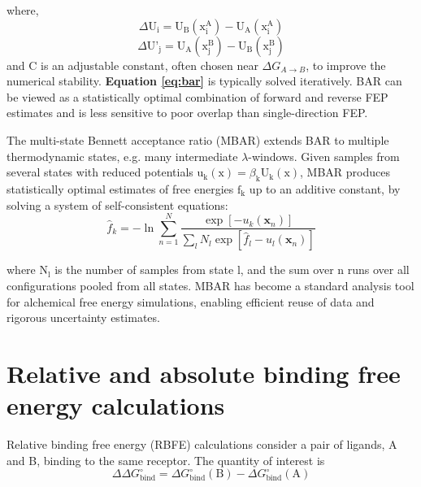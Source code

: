 \documentclass[12pt]{article}
\begin{document}
where,
\begin{equation}
 \Delta \textrm{U}_\textrm{i} = \textrm{U}_\textrm{B}(\textrm{x}_\textrm{i}^\textrm{A}) - \textrm{U}_\textrm{A}(\textrm{x}_\textrm{i}^\textrm{A}) 
\end{equation}
\begin{equation}
 \Delta \textrm{U'}_\textrm{j} = \textrm{U}_\textrm{A}(\textrm{x}_\textrm{j}^\textrm{B}) - \textrm{U}_\textrm{B}(\textrm{x}_\textrm{j}^\textrm{B})
\end{equation}
 and C is an adjustable constant, often chosen near $\Delta G_{A\to B}$, to improve the numerical stability. \textbf{Equation \ref{eq:bar}} is typically solved iteratively. BAR can be viewed as a statistically optimal combination of forward and reverse FEP estimates and is less sensitive to poor overlap than single-direction FEP\cite{CH10_bennett1976efficient,CH10_deruiter2013comparison}. 

The multi-state Bennett acceptance ratio (MBAR) extends BAR to multiple thermodynamic states, e.g. many intermediate $\lambda$-windows\cite{CH10_shirts2008mbar}. Given samples from several states with reduced potentials $\textrm{u}_\textrm{k}(\textrm{x}) = \beta_\textrm{k} \textrm{U}_\textrm{k}(\textrm{x})$, MBAR produces statistically optimal estimates of free energies $\textrm{f}_\textrm{k}$ up to an additive constant, by solving a system of self-consistent equations:
\begin{equation}
\hat{f}_k = -\ln \sum_{n=1}^{N} 
\frac{\exp\left[ -u_k(\mathbf{x}_n) \right]}
{\sum_{l} N_l \exp\left[ \hat{f}_l - u_l(\mathbf{x}_n) \right]}
\label{eq:mbar}
\end{equation}

where $\textrm{N}_\textrm{l}$ is the number of samples from state l, and the sum over n runs over all configurations pooled from all states. MBAR has become a standard analysis tool for alchemical free energy simulations, enabling efficient reuse of data and rigorous uncertainty estimates\cite{CH10_shirts2008mbar}. 

\section{Relative and absolute binding free energy calculations}

Relative binding free energy (RBFE) calculations consider a pair of ligands, A and B, binding to the same receptor. 
The quantity of interest is
\begin{equation}
\Delta\Delta G^\circ_\mathrm{bind}
= \Delta G^\circ_\mathrm{bind}(\mathrm{B}) 
- \Delta G^\circ_\mathrm{bind}(\mathrm{A})
\end{equation}
\end{document}
